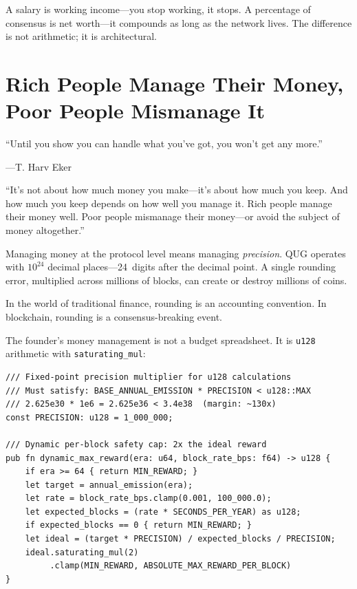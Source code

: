 \documentclass[11pt,a4paper]{article}
\begin{document}
\begin{principle}[title={\textbf{The Principle}}]
A salary is working income---you stop working, it stops.
A percentage of consensus is net worth---it compounds as long as the
network lives. The difference is not arithmetic; it is architectural.
\end{principle}


\section{Rich People Manage Their Money, Poor People Mismanage It}

\epigraph{``Until you show you can handle what you've got, you won't
get any more.''}%
{---T. Harv Eker}

\begin{wealthbox}[title={\raisebox{-0.5pt}{\tiny$\bigstar$} Wealth File \#5}]
``It's not about how much money you make---it's about how much you keep.
And how much you keep depends on how well you manage it.
Rich people manage their money well. Poor people mismanage their
money---or avoid the subject of money altogether.''
\end{wealthbox}

\vspace{0.3cm}

Managing money at the protocol level means managing \emph{precision}.
QUG operates with $10^{24}$ decimal places---24~digits after the decimal
point. A single rounding error, multiplied across millions of blocks,
can create or destroy millions of coins.

In the world of traditional finance, rounding is an accounting
convention. In blockchain, rounding is a consensus-breaking event.

The founder's money management is not a budget spreadsheet. It is
\texttt{u128} arithmetic with \texttt{saturating\_mul}:

\begin{lstlisting}[caption={Precision Money Management (\texttt{emission\_controller.rs})}]
/// Fixed-point precision multiplier for u128 calculations
/// Must satisfy: BASE_ANNUAL_EMISSION * PRECISION < u128::MAX
/// 2.625e30 * 1e6 = 2.625e36 < 3.4e38  (margin: ~130x)
const PRECISION: u128 = 1_000_000;

/// Dynamic per-block safety cap: 2x the ideal reward
pub fn dynamic_max_reward(era: u64, block_rate_bps: f64) -> u128 {
    if era >= 64 { return MIN_REWARD; }
    let target = annual_emission(era);
    let rate = block_rate_bps.clamp(0.001, 100_000.0);
    let expected_blocks = (rate * SECONDS_PER_YEAR) as u128;
    if expected_blocks == 0 { return MIN_REWARD; }
    let ideal = (target * PRECISION) / expected_blocks / PRECISION;
    ideal.saturating_mul(2)
         .clamp(MIN_REWARD, ABSOLUTE_MAX_REWARD_PER_BLOCK)
}
\end{lstlisting}
\end{document}
